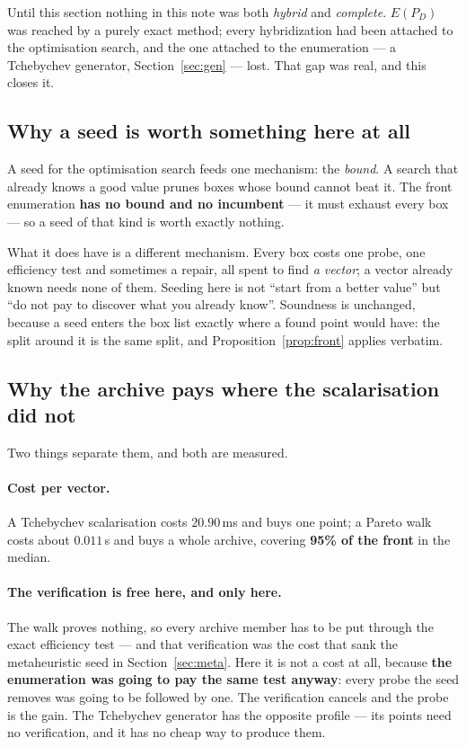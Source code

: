 \documentclass[11pt,a4paper]{article}
\newcommand{\Dset}{D}
\newcommand{\E}{E(P_{\Dset})}
\begin{document}
Until this section nothing in this note was both \emph{hybrid} and
\emph{complete}.  $\E$ was reached by a purely exact method; every
hybridization had been attached to the optimisation search, and the one
attached to the enumeration --- a Tchebychev generator, Section~\ref{sec:gen}
--- lost.  That gap was real, and this closes it.

\subsection{Why a seed is worth something here at all}

A seed for the optimisation search feeds one mechanism: the \emph{bound}.  A
search that already knows a good value prunes boxes whose bound cannot beat it.
The front enumeration \textbf{has no bound and no incumbent} --- it must
exhaust every box --- so a seed of that kind is worth exactly nothing.

What it does have is a different mechanism.  Every box costs one probe, one
efficiency test and sometimes a repair, all spent to find \emph{a vector}; a
vector already known needs none of them.  Seeding here is not ``start from a
better value'' but ``do not pay to discover what you already know''.
Soundness is unchanged, because a seed enters the box list exactly where a
found point would have: the split around it is the same split, and
Proposition~\ref{prop:front} applies verbatim.

\subsection{Why the archive pays where the scalarisation did not}

Two things separate them, and both are measured.

\paragraph{Cost per vector.}  A Tchebychev scalarisation costs $20.90$\,ms and
buys one point; a Pareto walk costs about $0.011$\,s and buys a whole archive,
covering \textbf{95\% of the front} in the median.

\paragraph{The verification is free here, and only here.}  The walk proves
nothing, so every archive member has to be put through the exact efficiency
test --- and that verification was the cost that sank the metaheuristic seed
in Section~\ref{sec:meta}.  Here it is not a cost at all, because \textbf{the
enumeration was going to pay the same test anyway}: every probe the seed
removes was going to be followed by one.  The verification cancels and the
probe is the gain.  The Tchebychev generator has the opposite profile --- its
points need no verification, and it has no cheap way to produce them.
\end{document}
